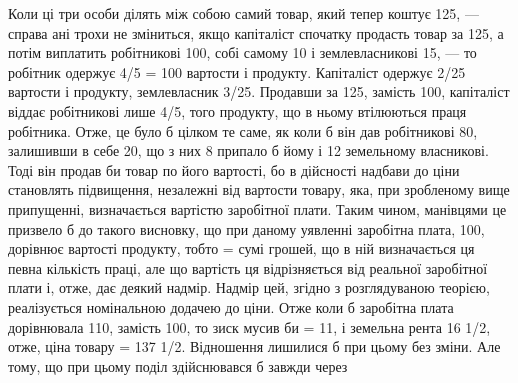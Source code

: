 Коли ці три особи ділять між собою самий товар, який тепер коштує
125, — справа ані трохи не зміниться, якщо капіталіст спочатку продасть
товар за 125, а потім виплатить робітникові 100, собі самому 10 і землевласникові
15, — то робітник одержує 4/5 = 100 вартости і продукту. Капіталіст
одержує 2/25 вартости і продукту, землевласник 3/25. Продавши за 125, замість
100, капіталіст віддає робітникові лише 4/5, того продукту, що в ньому втілюються
праця робітника. Отже, це було б цілком те саме, як коли б він дав
робітникові 80, залишивши в себе 20, що з них 8 припало б йому і 12 земельному
власникові. Тоді він продав би товар по його вартості, бо в дійсності
надбави до ціни становлять підвищення, незалежні від вартости товару, яка, при
зробленому вище припущенні, визначається вартістю заробітної плати. Таким
чином, манівцями це призвело б до такого висновку, що при даному уявленні
заробітна плата, 100, дорівнює вартості продукту, тобто = сумі грошей, що в
ній визначається ця певна кількість праці, але що вартість ця відрізняється від
реальної заробітної плати і, отже, дає деякий надмір. Надмір цей, згідно з розглядуваною
теорією, реалізується номінальною додачею до ціни. Отже коли б
заробітна плата дорівнювала 110, замість 100, то зиск мусив би = 11, і земельна
рента 16 1/2, отже, ціна товару = 137 1/2. Відношення лишилися б при
цьому без зміни. Але тому, що при цьому поділ здійснювався б завжди через

